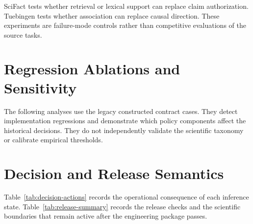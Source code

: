 \documentclass[preprint,12pt]{elsarticle}
\begin{document}
SciFact tests whether retrieval or lexical support can replace claim authorization. Tuebingen tests whether association can replace causal direction. These experiments are failure-mode controls rather than competitive evaluations of the source tasks.




\section{Regression Ablations and Sensitivity}

The following analyses use the legacy constructed contract cases. They detect implementation regressions and demonstrate which policy components affect the historical decisions. They do not independently validate the scientific taxonomy or calibrate empirical thresholds.




\section{Decision and Release Semantics}

Table~\ref{tab:decision-actions} records the operational consequence of each inference state. Table~\ref{tab:release-summary} records the release checks and the scientific boundaries that remain active after the engineering package passes.



\end{document}

